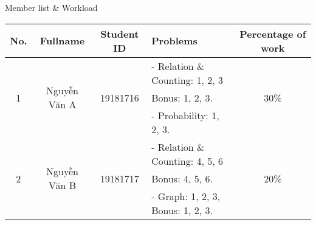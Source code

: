 Member list \& Workload

\begin{center}
	\begin{tabular}{|c|c|c|l|c|}
		\hline
		\textbf{No.}       & \textbf{Fullname}             & \textbf{Student ID}       & \textbf{Problems}                 & \textbf{Percentage of work} \\
		\hline
		\multirow{3}{*}{1} & \multirow{3}{*}{Nguyễn Văn A} & \multirow{3}{*}{19181716} & - Relation \& Counting: 1, 2, 3   & \multirow{3}{*}{30\%}       \\
		                   &                               &                           & Bonus: 1, 2, 3.                   &                             \\
		                   &                               &                           & - Probability: 1, 2, 3.           &                             \\
		\hline
		\multirow{3}{*}{2} & \multirow{3}{*}{Nguyễn Văn B} & \multirow{3}{*}{19181717} & - Relation \& Counting: 4, 5, 6   & \multirow{3}{*}{20\%}       \\
		                   &                               &                           & Bonus: 4, 5, 6.                   &                             \\
		                   &                               &                           & - Graph: 1, 2, 3, Bonus: 1, 2, 3. &                             \\
		\hline
	\end{tabular}
\end{center}